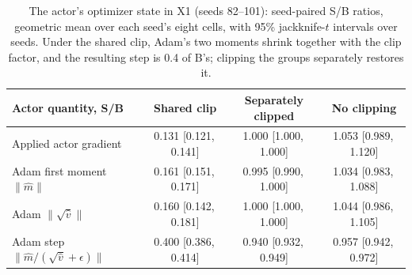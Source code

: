 \begin{table}[!htbp]
\caption{The actor's optimizer state in X1 (seeds 82--101): seed-paired S/B ratios, geometric mean over each seed's eight cells, with 95\% jackknife-$t$ intervals over seeds. Under the shared clip, Adam's two moments shrink together with the clip factor, and the resulting step is 0.4 of B's; clipping the groups separately restores it.}
\label{tab:x1opt}
\centering\footnotesize
\begin{tabular}{@{}lccc@{}}
\toprule
Actor quantity, S/B & Shared clip & Separately clipped & No clipping \\
\midrule
Applied actor gradient & 0.131 {\scriptsize [0.121,\,0.141]} & 1.000 {\scriptsize [1.000,\,1.000]} & 1.053 {\scriptsize [0.989,\,1.120]} \\
Adam first moment $\|\hat m\|$ & 0.161 {\scriptsize [0.151,\,0.171]} & 0.995 {\scriptsize [0.990,\,1.000]} & 1.034 {\scriptsize [0.983,\,1.088]} \\
Adam $\|\sqrt{\hat v}\|$ & 0.160 {\scriptsize [0.142,\,0.181]} & 1.000 {\scriptsize [1.000,\,1.000]} & 1.044 {\scriptsize [0.986,\,1.105]} \\
Adam step $\|\hat m/(\sqrt{\hat v}+\epsilon)\|$ & 0.400 {\scriptsize [0.386,\,0.414]} & 0.940 {\scriptsize [0.932,\,0.949]} & 0.957 {\scriptsize [0.942,\,0.972]} \\
\bottomrule
\end{tabular}
\end{table}
